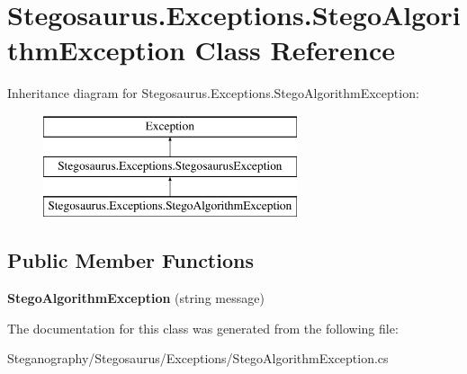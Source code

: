 \hypertarget{class_stegosaurus_1_1_exceptions_1_1_stego_algorithm_exception}{}\section{Stegosaurus.\+Exceptions.\+Stego\+Algorithm\+Exception Class Reference}
\label{class_stegosaurus_1_1_exceptions_1_1_stego_algorithm_exception}
Inheritance diagram for Stegosaurus.\+Exceptions.\+Stego\+Algorithm\+Exception\+:\begin{figure}[H]
\begin{center}
\leavevmode
\includegraphics[height=3.000000cm]{class_stegosaurus_1_1_exceptions_1_1_stego_algorithm_exception}
\end{center}
\end{figure}
\subsection*{Public Member Functions}
\begin{DoxyCompactItemize}
\item 
{\bfseries Stego\+Algorithm\+Exception} (string message)\hypertarget{class_stegosaurus_1_1_exceptions_1_1_stego_algorithm_exception_afc9700030f15037383e5d4e946e6e5bf}{}\label{class_stegosaurus_1_1_exceptions_1_1_stego_algorithm_exception_afc9700030f15037383e5d4e946e6e5bf}

\end{DoxyCompactItemize}


The documentation for this class was generated from the following file\+:\begin{DoxyCompactItemize}
\item 
Steganography/\+Stegosaurus/\+Exceptions/Stego\+Algorithm\+Exception.\+cs\end{DoxyCompactItemize}
